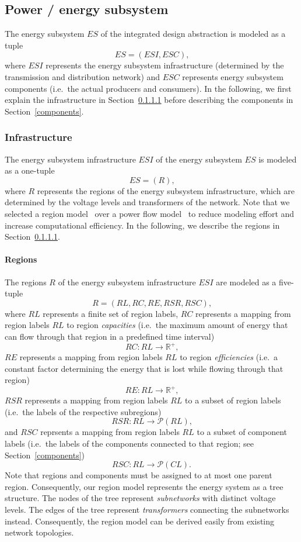 \subsection{Power / energy subsystem}
\label{energy_system}

The energy subsystem $ES$ of the integrated design abstraction is modeled as a tuple
\[
	ES = (ESI, ESC) \textrm{,}
\]
where $ESI$ represents the energy subsystem infrastructure (determined by the transmission and distribution network) and $ESC$ represents energy subsystem components (i.e.\ the actual producers and consumers). In the following, we first explain the infrastructure in Section~\ref{regions} before describing the components in Section~\ref{components}.

\subsubsection{Infrastructure}
\label{energy_infrastructure}

The energy subsystem infrastructure $ESI$ of the energy subsystem $ES$ is modeled as a one-tuple
\[
	ES = (R) \textrm{,}
\]
where $R$ represents the regions of the energy subsystem infrastructure, which are determined by the voltage levels and transformers of the network. Note that we selected a region model~\cite{Hackenberg2012} over a power flow model~\cite{Dommel1968} to reduce modeling effort and increase computational efficiency. In the following, we describe the regions in Section~\ref{regions}.

\paragraph{Regions}
\label{regions}

The regions $R$ of the energy subsystem infrastructure $ESI$ are modeled as a five-tuple
\[
	R = (RL, RC, RE, RSR, RSC) \textrm{,}
\]
where $RL$ represents a finite set of region labels, $RC$ represents a mapping from region labels $RL$ to region \textit{capacities} (i.e.\ the maximum amount of energy that can flow through that region in a predefined time interval)
\[
	RC: RL \rightarrow \mathbb{R}^+ \textrm{,}
\]
$RE$ represents a mapping from region labels $RL$ to region \textit{efficiencies} (i.e.\ a constant factor determining the energy that is lost while flowing through that region)
\[
	RE: RL \rightarrow \mathbb{R}^+ \textrm{,}
\]
$RSR$ represents a mapping from region labels $RL$ to a subset of region labels (i.e.\ the labels of the respective subregions)
\[
	RSR: RL \rightarrow \mathcal{P}(RL) \textrm{,}
\]
and $RSC$ reprsents a mapping from region labels $RL$ to a subset of component labels (i.e.\ the labels of the components connected to that region; see Section~\ref{components})
\[
	RSC: RL \rightarrow \mathcal{P}(CL) \textrm{.}
\]
Note that regions and components must be assigned to at most one parent region. Consequently, our region model represents the energy system as a tree structure. The nodes of the tree represent \textit{subnetworks} with distinct voltage levels. The edges of the tree represent \textit{transformers} connecting the subnetworks instead. Consequently, the region model can be derived easily from existing network topologies.

